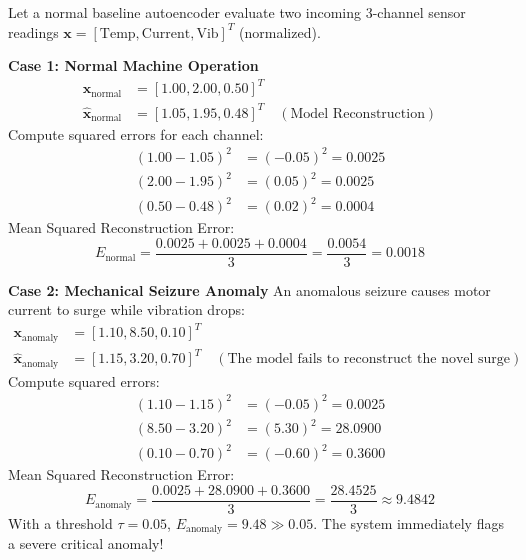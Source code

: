 \begin{example}
Let a normal baseline autoencoder evaluate two incoming 3-channel sensor readings $\mathbf{x} = [\text{Temp}, \text{Current}, \text{Vib}]^T$ (normalized).

\textbf{Case 1: Normal Machine Operation}
\begin{align*}
\mathbf{x}_{\text{normal}} &= [1.00, 2.00, 0.50]^T \\
\hat{\mathbf{x}}_{\text{normal}} &= [1.05, 1.95, 0.48]^T \quad (\text{Model Reconstruction})
\end{align*}
Compute squared errors for each channel:
\begin{align*}
(1.00 - 1.05)^2 &= (-0.05)^2 = 0.0025 \\
(2.00 - 1.95)^2 &= (0.05)^2 = 0.0025 \\
(0.50 - 0.48)^2 &= (0.02)^2 = 0.0004
\end{align*}
Mean Squared Reconstruction Error:
\begin{equation*}
E_{\text{normal}} = \frac{0.0025 + 0.0025 + 0.0004}{3} = \frac{0.0054}{3} = \mathbf{0.0018}
\end{equation*}

\textbf{Case 2: Mechanical Seizure Anomaly}
An anomalous seizure causes motor current to surge while vibration drops:
\begin{align*}
\mathbf{x}_{\text{anomaly}} &= [1.10, 8.50, 0.10]^T \\
\hat{\mathbf{x}}_{\text{anomaly}} &= [1.15, 3.20, 0.70]^T \quad (\text{The model fails to reconstruct the novel surge})
\end{align*}
Compute squared errors:
\begin{align*}
(1.10 - 1.15)^2 &= (-0.05)^2 = 0.0025 \\
(8.50 - 3.20)^2 &= (5.30)^2 = 28.0900 \\
(0.10 - 0.70)^2 &= (-0.60)^2 = 0.3600
\end{align*}
Mean Squared Reconstruction Error:
\begin{equation*}
E_{\text{anomaly}} = \frac{0.0025 + 28.0900 + 0.3600}{3} = \frac{28.4525}{3} \approx \mathbf{9.4842}
\end{equation*}
With a threshold $\tau = 0.05$, $E_{\text{anomaly}} = 9.48 \gg 0.05$. The system immediately flags a severe critical anomaly!
\end{example}

